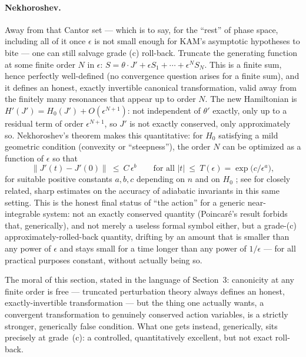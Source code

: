 \documentclass[11pt]{article}
\begin{document}
\paragraph{Nekhoroshev.} Away from that Cantor set --- which is to say, for the ``rest'' of phase space, including all of it once $\epsilon$ is not small enough for KAM's asymptotic hypotheses to bite --- one can still salvage grade (c) roll-back. Truncate the generating function at some finite order $N$ in $\epsilon$: $S=\theta\cdot J'+\epsilon S_1+\cdots+\epsilon^N S_N$. This is a finite sum, hence perfectly well-defined (no convergence question arises for a finite sum), and it defines an honest, exactly invertible canonical transformation, valid away from the finitely many resonances that appear up to order $N$. The new Hamiltonian is $H'(J')=H_0(J')+O(\epsilon^{N+1})$: not independent of $\theta'$ exactly, only up to a residual term of order $\epsilon^{N+1}$, so $J'$ is not exactly conserved, only approximately so. Nekhoroshev's theorem makes this quantitative: for $H_0$ satisfying a mild geometric condition (convexity or ``steepness''), the order $N$ can be optimized as a function of $\epsilon$ so that
\begin{equation}
\big\|J'(t)-J'(0)\big\|\ \le\ C\,\epsilon^{b}\qquad\text{for all }|t|\ \le\ T(\epsilon)=\exp\!\big(c/\epsilon^{a}\big),
\label{eq:nekhoroshev}
\end{equation}
for suitable positive constants $a,b,c$ depending on $n$ and on $H_0$ \cite{Nekhoroshev1977}; see \cite{Neishtadt1981} for closely related, sharp estimates on the accuracy of adiabatic invariants in this same setting. This is the honest final status of ``the action'' for a generic near-integrable system: not an exactly conserved quantity (Poincar\'e's result forbids that, generically), and not merely a useless formal symbol either, but a grade-(c) approximately-rolled-back quantity, drifting by an amount that is smaller than any power of $\epsilon$ and stays small for a time longer than any power of $1/\epsilon$ --- for all practical purposes constant, without actually being so.

The moral of this section, stated in the language of Section~3: canonicity at any finite order is free --- truncated perturbation theory always defines an honest, exactly-invertible transformation --- but the thing one actually wants, a convergent transformation to genuinely conserved action variables, is a strictly stronger, generically false condition. What one gets instead, generically, sits precisely at grade~(c): a controlled, quantitatively excellent, but not exact roll-back.
\end{document}
